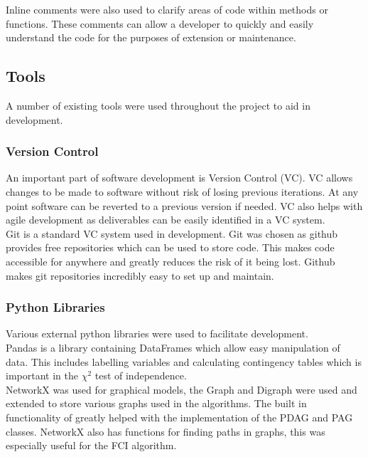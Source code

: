 \documentclass{article}
\begin{document}
Inline comments were also used to clarify areas of code within methods or functions. These comments can allow a developer to quickly and easily understand the code for the purposes of extension or maintenance. 



\subsection{Tools}
A number of existing tools were used throughout the project to aid in development. 

\subsubsection{Version Control}
An important part of software development is Version Control (VC). VC allows changes to be made to software without risk of losing previous iterations. At any point software can be reverted to a previous version if needed. VC also helps with agile development as deliverables can be easily identified in a VC system.\\

Git is a standard VC system used in development. Git was chosen as github provides free repositories which can be used to store code. This makes code accessible for anywhere and greatly reduces the risk of it being lost. Github makes git repositories incredibly easy to set up and maintain.\\

\subsubsection{Python Libraries}
Various external python libraries were used to facilitate development.\\

Pandas is a library containing DataFrames which allow easy manipulation of data. This includes labelling variables and calculating contingency tables which is important in the $\chi^2$ test of independence.\\

NetworkX was used for graphical models, the Graph and Digraph were used and extended to store various graphs used in the algorithms. The built in functionality of greatly helped with the implementation of the PDAG and PAG classes. NetworkX also has functions for finding paths in graphs, this was especially useful for the FCI algorithm.\\
\end{document}

